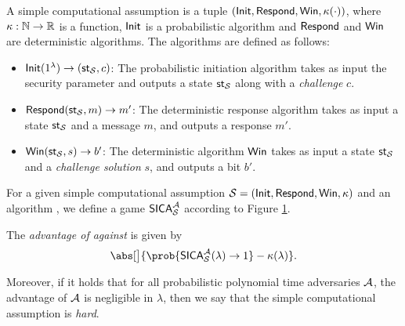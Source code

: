 \begin{definition}\label{def:simple}
  A simple computational assumption is a tuple \((\mathsf{Init},\mathsf{Respond},\mathsf{Win},\kappa(\cdot))\),
  where \(\kappa : \mathbb{N} \to \mathbb{R}\) is a function,
  \(\mathsf{Init}\) is a probabilistic algorithm
  and \(\mathsf{Respond}\) and \(\mathsf{Win}\) are deterministic algorithms.
  The algorithms are defined as follows:
  \begin{itemize}[label={\textbullet},itemsep=0.1cm]
    \item \(\mathsf{Init}(1^{\lambda}) \to (\mathsf{st}_{\mathcal{S}},c)\):
          The probabilistic initiation algorithm
          takes as input the security parameter and outputs a state \(\mathsf{st}_{\mathcal{S}}\)
          along with a \emph{challenge} \(c\).
    \item \(\mathsf{Respond}(\mathsf{st}_{\mathcal{S}},m) \to m'\):
          The deterministic response algorithm
          takes as input a state \(\mathsf{st}_{\mathcal{S}}\)
          and a message \(m\), and outputs a response \(m'\).
    \item \(\mathsf{Win}(\mathsf{st}_{\mathcal{S}},s) \to b'\):
          The deterministic algorithm \(\mathsf{Win}\)
          takes as input a state \(\mathsf{st}_{\mathcal{S}}\)
          and a \emph{challenge solution} \(s\),
          and outputs a bit \(b'\).
  \end{itemize}

  For a given simple computational assumption \(\mathcal{S} = (\mathsf{Init},\mathsf{Respond},\mathsf{Win},\kappa)\)
  and an algorithm \advA, we define a game \(\mathsf{SICA}_{\mathcal{S}}^{\mathcal{A}}\)
  according to Figure \ref{fig:simple}.

  The \emph{advantage of \advA{} against \Simple} is given by
  \begin{equation}\label{eq:simple}
    \abs[\big]{\prob{\SICA_{\Simple}^{\advA}(\lambda) \to 1} - \kappa(\lambda)}.
  \end{equation}

  Moreover, if it holds that for all probabilistic polynomial time adversaries \(\mathcal{A}\),
  the advantage of \(\mathcal{A}\) is negligible in \(\lambda\),
  then we say that the simple computational assumption is \emph{hard}.
\end{definition}

\begin{figure}
  \begin{pchstack}[center,space=0.5cm]
  \end{pchstack}\caption{}\label{fig:simple}
\end{figure}

